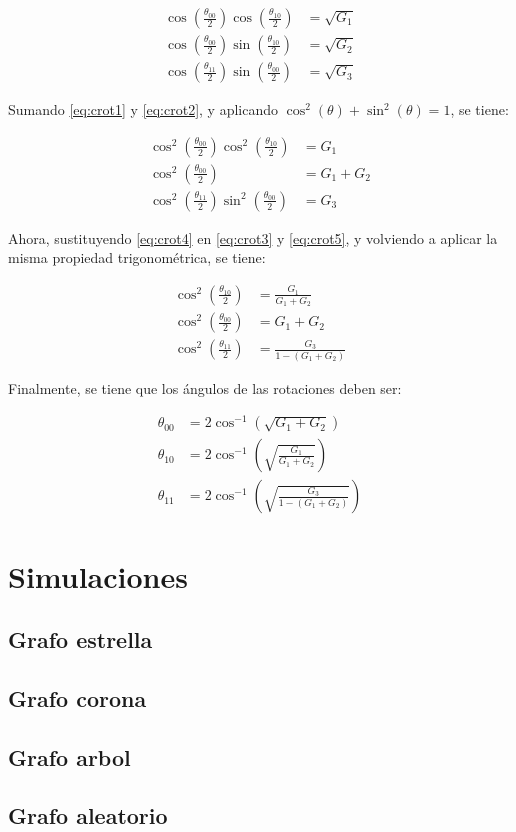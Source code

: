 \begin{align}
    \cos(\frac{\theta_{00}}{2}) \cos(\frac{\theta_{10}}{2}) &= \sqrt{G_1}
    \label{eq:crot1} \\
    \cos(\frac{\theta_{00}}{2}) \sin(\frac{\theta_{10}}{2}) &= \sqrt{G_2}
    \label{eq:crot2} \\
    \cos(\frac{\theta_{11}}{2}) \sin(\frac{\theta_{00}}{2}) &= \sqrt{G_3}
\end{align}

Sumando \ref{eq:crot1} y \ref{eq:crot2}, y aplicando $\cos^2(\theta) + \sin^2(\theta) = 1$, se tiene:

\begin{align}
    \cos^2(\frac{\theta_{00}}{2}) \cos^2(\frac{\theta_{10}}{2}) &= G_1
    \label{eq:crot3} \\
    \cos^2(\frac{\theta_{00}}{2}) &= G_1 + G_2
    \label{eq:crot4} \\
    \cos^2(\frac{\theta_{11}}{2}) \sin^2(\frac{\theta_{00}}{2}) &= G_3
    \label{eq:crot5}
\end{align}

Ahora, sustituyendo \ref{eq:crot4} en \ref{eq:crot3} y \ref{eq:crot5}, y volviendo a aplicar la misma propiedad trigonométrica, se tiene:

\begin{align}
    \cos^2(\frac{\theta_{10}}{2}) &= \frac{G_1}{G_1 + G_2} \\
    \cos^2(\frac{\theta_{00}}{2}) &= G_1 + G_2 \\
    \cos^2(\frac{\theta_{11}}{2}) &= \frac{G_3}{1-(G_1 + G_2)}
\end{align}

Finalmente, se tiene que los ángulos de las rotaciones deben ser:

\begin{align}
    \theta_{00} &= 2 \cos^{-1}\left(\sqrt{G_1 + G_2}\right) \\
    \theta_{10} &= 2 \cos^{-1}\left(\sqrt{\frac{G_1}{G_1 + G_2}}\right) \\
    \theta_{11} &= 2 \cos^{-1}\left(\sqrt{\frac{G_3}{1 - (G_1 + G_2)}}\right)
\end{align}

\section{Simulaciones}

\subsection{Grafo estrella}

\subsection{Grafo corona}

\subsection{Grafo arbol}

\subsection{Grafo aleatorio}
